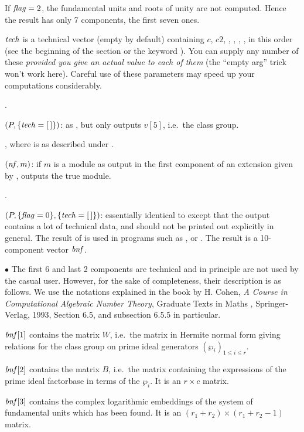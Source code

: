 If $\hbox{\it f\kern0pt lag\/}=2$, the fundamental units and roots of unity are not computed.
Hence the result has only 7 components, the first seven ones.

$\hbox{\it tech\/}$ is a technical vector (empty by default) containing $c$, $c2$,
, , , , in this order (see
the beginning of the section or the keyword ).
You can supply any number of these \emph{provided you give an actual value to
each of them} (the ``empty arg'' trick won't work here). Careful use of these
parameters may speed up your computations considerably.

.

$(P,\{\hbox{\it tech\/}=[\,]\})$: as , but only
outputs $v[5]$, i.e.~the class group.

, where 
is as described under .

$(\hbox{\it nf\/},m)$: if $m$ is a module as output in the
first component of an extension given by , outputs the
true module.

.

$(P,\{\hbox{\it f\kern0pt lag\/}=0\},\{\hbox{\it tech\/}=[\,]\})$: essentially identical
to  except that the output contains a lot of technical data,
and should not be printed out explicitly in general. The result of
 is used in programs such as ,
 or . The result is a 10-component vector
$\hbox{\it bnf\/}$.

\noindent $\bullet$ The first 6 and last 2 components are technical and in
principle are not used by the casual user. However, for the sake of
completeness, their description is as follows. We use the notations explained
in the book by H. Cohen, \emph{A Course in Computational Algebraic Number
Theory}, Graduate Texts in Maths , Springer-Verlag, 1993, Section
6.5, and subsection 6.5.5 in particular.

$\hbox{\it bnf\/}[1]$ contains the matrix $W$, i.e.~the matrix in Hermite normal
form giving relations for the class group on prime ideal generators
$(\wp_i)_{1\le i\le r}$.

$\hbox{\it bnf\/}[2]$ contains the matrix $B$, i.e.~the matrix containing the
expressions of the prime ideal factorbase in terms of the $\wp_i$. It is an
$r\times c$ matrix.

$\hbox{\it bnf\/}[3]$ contains the complex logarithmic embeddings of the system of
fundamental units which has been found. It is an $(r_1+r_2)\times(r_1+r_2-1)$
matrix.

